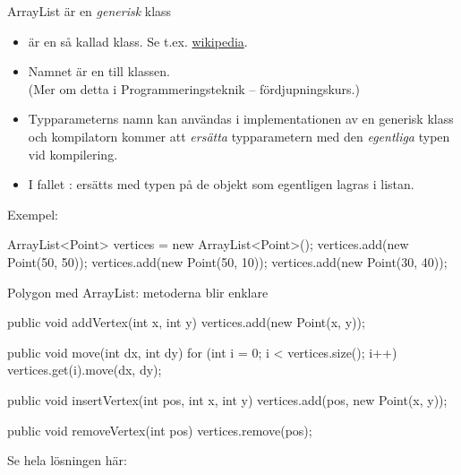 \documentclass{lecturenotes}
\begin{document}
\begin{Slide}{ArrayList är en \emph{generisk} klass}\footnotesize
\begin{itemize}
\item {} är en så kallad   klass. Se t.ex. \href{https://en.wikipedia.org/wiki/Generics_in_Java}{wikipedia}.
\item Namnet  är en  till klassen. \\(Mer om detta i Programmeringsteknik – fördjupningskurs.)
\item Typparameterns namn kan användas i implementationen av en generisk klass och kompilatorn kommer att \emph{ersätta} typparametern med den \emph{egentliga} typen vid kompilering.
\item I fallet :  ersätts med typen på de objekt som egentligen lagras i listan.  
\end{itemize}
Exempel:
\begin{Code}[numberstyle=]
ArrayList<Point> vertices = new ArrayList<Point>(); 
vertices.add(new Point(50, 50));
vertices.add(new Point(50, 10)); 
vertices.add(new Point(30, 40)); 
\end{Code}
\end{Slide}

\begin{Slide}{Polygon med ArrayList: metoderna blir enklare}
\begin{Code}[numberstyle=]
    public void addVertex(int x, int y) {  
        vertices.add(new Point(x, y));
    }
    
    public void move(int dx, int dy) {
        for (int i = 0; i < vertices.size(); i++) {
        	vertices.get(i).move(dx, dy);
        }
    }
    
    public void insertVertex(int pos, int x, int y) {
    	vertices.add(pos, new Point(x, y));
    }
    
    public void removeVertex(int pos) {
    	vertices.remove(pos);
    }
\end{Code}

Se hela lösningen här:\\
\url{}
\end{Slide}
\end{document}
